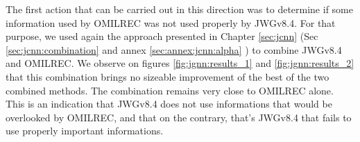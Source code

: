\documentclass[../main.tex]{subfiles}
\begin{document}
The first action that can be carried out in this direction was to determine if some information used by OMILREC was not used properly by JWGv8.4. For that purpose, we used again the approach presented in Chapter \ref{sec:jcnn} (Sec \ref{sec:jcnn:combination} and annex \ref{sec:annex:jcnn:alpha} ) to combine JWGv8.4 and OMILREC. We observe on figures \ref{fig:jgnn:results_1} and \ref{fig:jgnn:results_2} that this combination brings no sizeable improvement  of the best of the two combined methods. The combination remains very close to OMILREC alone. This is an indication that JWGv8.4 does not use informations that would be overlooked by OMILREC, and that on the contrary, that's JWGv8.4 that fails to use properly important informations.

%
%
\end{document}
